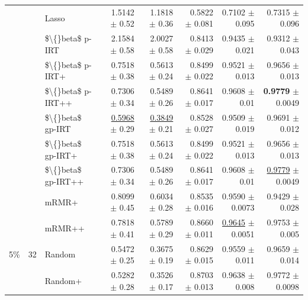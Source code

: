 \begin{longtable}{llp{}rrrrr}
 &  & Lasso & 1.5142 {\scriptsize $\pm$ 0.52} & 1.1818 {\scriptsize $\pm$ 0.36} & 0.5822 {\scriptsize $\pm$ 0.081} & 0.7102 {\scriptsize $\pm$ 0.095} & 0.7315 {\scriptsize $\pm$ 0.096} \\
 &  & \$\textbackslash\{\}beta\$ p-IRT & 2.1584 {\scriptsize $\pm$ 0.58} & 2.0027 {\scriptsize $\pm$ 0.58} & 0.8413 {\scriptsize $\pm$ 0.029} & 0.9435 {\scriptsize $\pm$ 0.021} & 0.9312 {\scriptsize $\pm$ 0.043} \\
 &  & \$\textbackslash\{\}beta\$ p-IRT+ & 0.7518 {\scriptsize $\pm$ 0.38} & 0.5613 {\scriptsize $\pm$ 0.24} & 0.8499 {\scriptsize $\pm$ 0.022} & 0.9521 {\scriptsize $\pm$ 0.013} & 0.9656 {\scriptsize $\pm$ 0.013} \\
 &  & \$\textbackslash\{\}beta\$ p-IRT++ & 0.7306 {\scriptsize $\pm$ 0.34} & 0.5489 {\scriptsize $\pm$ 0.26} & 0.8641 {\scriptsize $\pm$ 0.017} & 0.9608 {\scriptsize $\pm$ 0.01} & \textbf{0.9779} {\scriptsize $\pm$ 0.0049} \\
 &  & \$\textbackslash\{\}beta\$ gp-IRT & \underline{0.5968} {\scriptsize $\pm$ 0.29} & \underline{0.3849} {\scriptsize $\pm$ 0.21} & 0.8528 {\scriptsize $\pm$ 0.027} & 0.9509 {\scriptsize $\pm$ 0.019} & 0.9691 {\scriptsize $\pm$ 0.012} \\
 &  & \$\textbackslash\{\}beta\$ gp-IRT+ & 0.7518 {\scriptsize $\pm$ 0.38} & 0.5613 {\scriptsize $\pm$ 0.24} & 0.8499 {\scriptsize $\pm$ 0.022} & 0.9521 {\scriptsize $\pm$ 0.013} & 0.9656 {\scriptsize $\pm$ 0.013} \\
 &  & \$\textbackslash\{\}beta\$ gp-IRT++ & 0.7306 {\scriptsize $\pm$ 0.34} & 0.5489 {\scriptsize $\pm$ 0.26} & 0.8641 {\scriptsize $\pm$ 0.017} & 0.9608 {\scriptsize $\pm$ 0.01} & \underline{0.9779} {\scriptsize $\pm$ 0.0049} \\
 &  & mRMR+ & 0.8099 {\scriptsize $\pm$ 0.45} & 0.6034 {\scriptsize $\pm$ 0.28} & 0.8535 {\scriptsize $\pm$ 0.016} & 0.9590 {\scriptsize $\pm$ 0.0073} & 0.9429 {\scriptsize $\pm$ 0.028} \\
 &  & mRMR++ & 0.7818 {\scriptsize $\pm$ 0.41} & 0.5789 {\scriptsize $\pm$ 0.29} & 0.8660 {\scriptsize $\pm$ 0.011} & \underline{0.9645} {\scriptsize $\pm$ 0.0051} & 0.9753 {\scriptsize $\pm$ 0.005} \\
\midrule
5\% & 32 & Random & 0.5472 {\scriptsize $\pm$ 0.25} & 0.3675 {\scriptsize $\pm$ 0.19} & 0.8629 {\scriptsize $\pm$ 0.015} & 0.9559 {\scriptsize $\pm$ 0.011} & 0.9659 {\scriptsize $\pm$ 0.014} \\
 &  & Random+ & 0.5282 {\scriptsize $\pm$ 0.28} & 0.3526 {\scriptsize $\pm$ 0.17} & 0.8703 {\scriptsize $\pm$ 0.013} & 0.9638 {\scriptsize $\pm$ 0.008} & 0.9772 {\scriptsize $\pm$ 0.0098} \\

\end{longtable}
